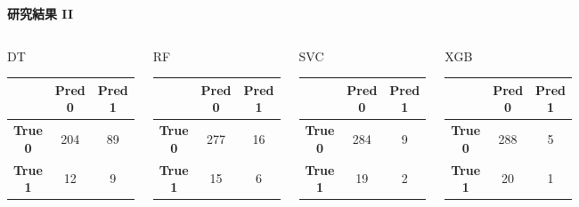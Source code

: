 \documentclass[12pt,aspectratio=43]{beamer}
\begin{document}
\begin{frame}{\textbf{研究結果 II}}
  \begin{columns}[T,onlytextwidth]
    \begin{block}{DT}
    {\footnotesize
    \setlength{\tabcolsep}{5pt}\renewcommand{\arraystretch}{1.15}
    \begin{tabular}{c|cc}
             & \textbf{Pred 0} & \textbf{Pred 1} \\ \hline
    \textbf{True 0} & 204 & 89 \\
    \textbf{True 1} & 12  & 9  \\
    \end{tabular}}
    \end{block}

    \begin{block}{RF}
    {\footnotesize
    \setlength{\tabcolsep}{5pt}\renewcommand{\arraystretch}{1.15}
    \begin{tabular}{c|cc}
             & \textbf{Pred 0} & \textbf{Pred 1} \\ \hline
    \textbf{True 0} & 277 & 16 \\
    \textbf{True 1} & 15  & 6  \\
    \end{tabular}}
    \end{block}

    \begin{block}{SVC}
    {\footnotesize
    \setlength{\tabcolsep}{5pt}\renewcommand{\arraystretch}{1.15}
    \begin{tabular}{c|cc}
             & \textbf{Pred 0} & \textbf{Pred 1} \\ \hline
    \textbf{True 0} & 284 & 9 \\
    \textbf{True 1} & 19  & 2 \\
    \end{tabular}}
    \end{block}

    \begin{block}{XGB}
    {\footnotesize
    \setlength{\tabcolsep}{5pt}\renewcommand{\arraystretch}{1.15}
    \begin{tabular}{c|cc}
             & \textbf{Pred 0} & \textbf{Pred 1} \\ \hline
    \textbf{True 0} & 288 & 5 \\
    \textbf{True 1} & 20  & 1 \\
    \end{tabular}}
    \end{block}
\end{columns}
\end{frame}
\end{document}
